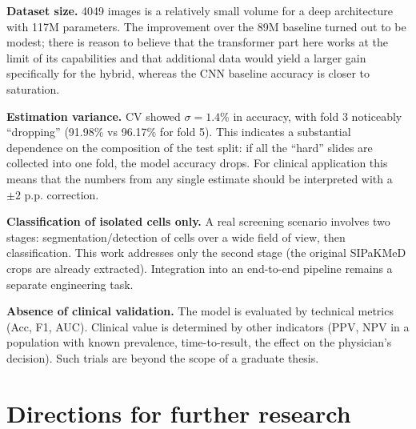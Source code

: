 \documentclass[14pt,a4paper]{extreport}
\begin{document}
\textbf{Dataset size.} 4049 images is a relatively small volume for a
deep architecture with 117M parameters. The improvement over the 89M
baseline turned out to be modest; there is reason to believe that the
transformer part here works at the limit of its capabilities and that
additional data would yield a larger gain specifically for the hybrid,
whereas the CNN baseline accuracy is closer to saturation.

\textbf{Estimation variance.} CV showed $\sigma = 1.4$\% in accuracy,
with fold 3 noticeably ``dropping'' (91.98\% vs 96.17\% for fold 5).
This indicates a substantial dependence on the composition of the test
split: if all the ``hard'' slides are collected into one fold, the model
accuracy drops. For clinical application this means that the numbers
from any single estimate should be interpreted with a $\pm 2$ p.p.
correction.

\textbf{Classification of isolated cells only.} A real screening
scenario involves two stages: segmentation/detection of cells over a
wide field of view, then classification. This work addresses only the
second stage (the original SIPaKMeD crops are already extracted).
Integration into an end-to-end pipeline remains a separate engineering
task.

\textbf{Absence of clinical validation.} The model is evaluated by
technical metrics (Acc, F1, AUC). Clinical value is determined by other
indicators (PPV, NPV in a population with known prevalence,
time-to-result, the effect on the physician's decision). Such trials are
beyond the scope of a graduate thesis.

\section{Directions for further research}
\end{document}
